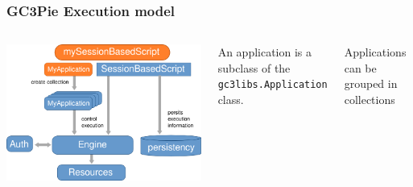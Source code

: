 \documentclass[english,serif,mathserif,xcolor=pdftex,dvipsnames,table]{beamer}
\begin{document}
\begin{frame}
  \frametitle{GC3Pie Execution model}
  \begin{columns}
      \includegraphics[width=1\textwidth]{fig/GC3Pie_execution_model}
  \begin{block}{}
    An application is a subclass of the \texttt{gc3libs.Application}
    class. \\
  \end{block}

  \begin{block}{}
    Applications can be grouped in {\color{Blue}collections}
  \end{block}
  \end{columns}
\end{frame}
  
\end{document}
